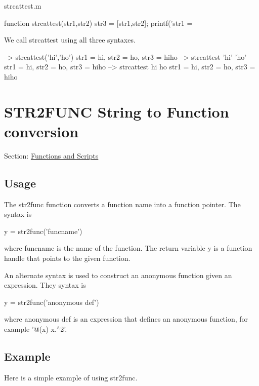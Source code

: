 \begin{DoxyVerb}     strcattest.m
\end{DoxyVerb}



\begin{DoxyVerbInclude}
function strcattest(str1,str2)
  str3 = [str1,str2];
  printf('str1 = %
\end{DoxyVerbInclude}


We call {\ttfamily strcattest} using all three syntaxes.


\begin{DoxyVerbInclude}
--> strcattest('hi','ho')
str1 = hi, str2 = ho, str3 = hiho
--> strcattest 'hi' 'ho'
str1 = hi, str2 = ho, str3 = hiho
--> strcattest hi ho
str1 = hi, str2 = ho, str3 = hiho
\end{DoxyVerbInclude}
 \hypertarget{functions_str2func}{}\section{S\-T\-R2\-F\-U\-N\-C String to Function conversion}\label{functions_str2func}
Section\-: \hyperlink{sec_functions}{Functions and Scripts} \hypertarget{vtkwidgets_vtkxyplotwidget_Usage}{}\subsection{Usage}\label{vtkwidgets_vtkxyplotwidget_Usage}
The {\ttfamily str2func} function converts a function name into a function pointer. The syntax is \begin{DoxyVerb}    y = str2func('funcname')
\end{DoxyVerb}
 where {\ttfamily funcname} is the name of the function. The return variable {\ttfamily y} is a function handle that points to the given function.

An alternate syntax is used to construct an anonymous function given an expression. They syntax is \begin{DoxyVerb}    y = str2func('anonymous def')
\end{DoxyVerb}
 where {\ttfamily anonymous def} is an expression that defines an anonymous function, for example {\ttfamily '@(x) x.$^\wedge$2'}. \hypertarget{variables_struct_Example}{}\subsection{Example}\label{variables_struct_Example}
Here is a simple example of using {\ttfamily str2func}.


